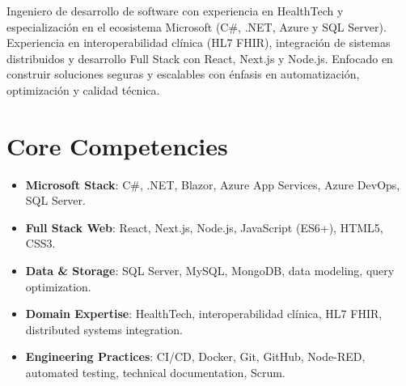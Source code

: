 \documentclass[11pt,a4paper,sans]{moderncv}
\begin{document}
\makecvtitle


\vspace{6pt}
\small{Ingeniero de desarrollo de software con experiencia en HealthTech y especialización en el ecosistema Microsoft (C\#, .NET, Azure y SQL Server). Experiencia en interoperabilidad clínica (HL7 FHIR), integración de sistemas distribuidos y desarrollo Full Stack con React, Next.js y Node.js. Enfocado en construir soluciones seguras y escalables con énfasis en automatización, optimización y calidad técnica.}


\section{Core Competencies}
\vspace{1pt}
\begin{itemize}

\item \textbf{Microsoft Stack}: C\#, .NET, Blazor, Azure App Services, Azure DevOps, SQL Server.

\item \textbf{Full Stack Web}: React, Next.js, Node.js, JavaScript (ES6+), HTML5, CSS3.

\item \textbf{Data \& Storage}: SQL Server, MySQL, MongoDB, data modeling, query optimization.

\item \textbf{Domain Expertise}: HealthTech, interoperabilidad clínica, HL7 FHIR, distributed systems integration.

\item \textbf{Engineering Practices}: CI/CD, Docker, Git, GitHub, Node-RED, automated testing, technical documentation, Scrum.

\end{itemize}

\end{document}
